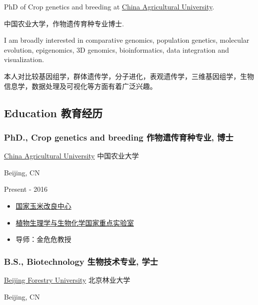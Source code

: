 \documentclass[]{article}
\providecommand{\tightlist}{%
  \setlength{\itemsep}{0pt}\setlength{\parskip}{0pt}}
\begin{document}
PhD of Crop genetics and breeding at \href{http://www.cau.edu.cn/}{China
Agricultural University}.

中国农业大学，作物遗传育种专业博士.

I am broadly interested in comparative genomics, population genetics,
molecular evolution, epigenomics, 3D genomics, bioinformatics, data
integration and visualization.

本人对比较基因组学，群体遗传学，分子进化，表观遗传学，三维基因组学，生物信息学，数据处理及可视化等方面有着广泛兴趣。

\hypertarget{education-ux6559ux80b2ux7ecfux5386}{%
\subsection{Education
教育经历}\label{education-ux6559ux80b2ux7ecfux5386}}

\hypertarget{phd.-crop-genetics-and-breeding-ux4f5cux7269ux9057ux4f20ux80b2ux79cdux4e13ux4e1a-ux535aux58eb}{%
\subsubsection{PhD., Crop genetics and breeding 作物遗传育种专业,
博士}\label{phd.-crop-genetics-and-breeding-ux4f5cux7269ux9057ux4f20ux80b2ux79cdux4e13ux4e1a-ux535aux58eb}}

\href{http://cau.edu.cn/}{China Agricultural University} 中国农业大学

Beijing, CN

Present - 2016

\begin{itemize}
\tightlist
\item
  ﻿\href{http://maizecenter.cau.edu.cn/f}{国家玉米改良中心}
\item
  \href{http://sklppb.cau.edu.cn/}{植物生理学与生物化学国家重点实验室}
\item
  导师：金危危教授
\end{itemize}

\hypertarget{b.s.-biotechnology-ux751fux7269ux6280ux672fux4e13ux4e1a-ux5b66ux58eb}{%
\subsubsection{B.S., Biotechnology 生物技术专业,
学士}\label{b.s.-biotechnology-ux751fux7269ux6280ux672fux4e13ux4e1a-ux5b66ux58eb}}

\href{http://www.bjfu.edu.cn}{Beijing Forestry University} 北京林业大学

Beijing, CN
\end{document}

